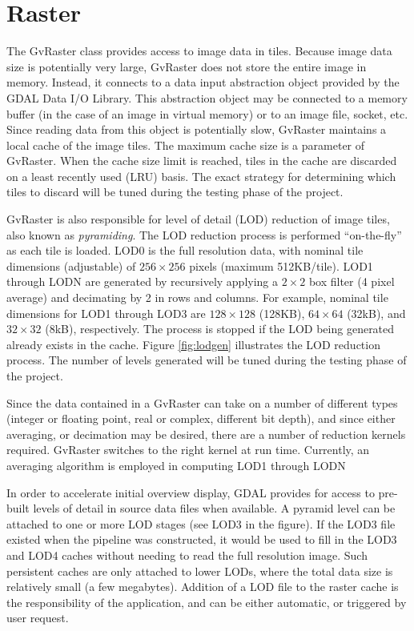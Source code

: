 \documentclass{openevreport}
\begin{document}
\section{Raster}

The GvRaster class provides access to image data in tiles.  Because
image data size is potentially very large, GvRaster does not store the
entire image in memory.  Instead, it connects to a data input
abstraction object provided by the GDAL Data I/O Library.  This abstraction
object may be connected to a memory buffer (in the case of an image in
virtual memory) or to an image file, socket, etc.  Since reading data
from this object is potentially slow, GvRaster maintains a local cache
of the image tiles.  The maximum cache size is a parameter of
GvRaster.  When the cache size limit is reached, tiles in the cache
are discarded on a least recently used (LRU) basis.  The exact
strategy for determining which tiles to discard will be tuned during
the testing phase of the project.

GvRaster is also responsible for level of detail (LOD) reduction of
image tiles, also known as \emph{pyramiding}.  The LOD reduction
process is performed ``on-the-fly'' as each tile is loaded.  LOD0 is
the full resolution data, with nominal tile dimensions (adjustable) of
$256\times 256$ pixels (maximum 512KB/tile).  LOD1 through LODN are
generated by recursively applying a $2\times 2$ box filter (4 pixel
average) and decimating by 2 in rows and columns.  For example,
nominal tile dimensions for LOD1 through LOD3 are $128\times 128$
(128KB), $64\times 64$ (32kB), and $32\times 32$ (8kB),
respectively.  The process is stopped if the LOD being generated
already exists in the cache.  Figure \ref{fig:lodgen} illustrates the
LOD reduction process.  The number of levels generated will be tuned during the
testing phase of the project.

Since the data contained in a GvRaster can take on a number of
different types (integer or floating point, real or complex, different 
bit depth), and since either averaging, or decimation may be desired, there are
a number of reduction kernels required.  GvRaster
switches to the right kernel at run time.  Currently, an averaging algorithm
is employed in computing LOD1 through LODN

In order to accelerate initial overview display, GDAL provides for access
to pre-built levels of detail in source data files when available. 
A pyramid level can be attached to one or more LOD stages (see LOD3
in the figure).  If the LOD3 file existed when the pipeline was constructed,
it would be used to fill in the LOD3 and LOD4 caches without needing
to read the full resolution image.  Such persistent caches are only
attached to lower LODs, where the total data size is relatively small
(a few megabytes).  Addition of a LOD file to the raster cache is the
responsibility of the application, and can be either automatic, or
triggered by user request.
\end{document}

